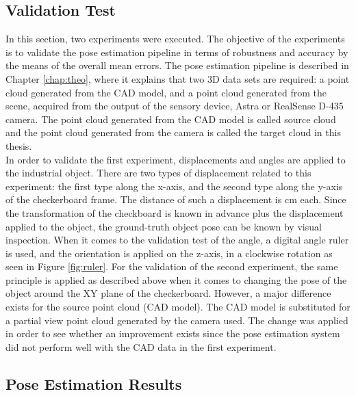 \subsection{Validation Test}\label{valitest}

In this section, two experiments were executed. The objective of the experiments is to validate the pose estimation pipeline in terms of robustness and accuracy by the means of the overall mean errors. The pose estimation pipeline is described in Chapter \ref{chap:theo}, where it explains that two 3D data sets are required: a point cloud generated from the CAD model, and a point cloud generated from the scene, acquired from the output of the sensory device, Astra or RealSense D-435 camera. The point cloud generated from the CAD model is called source cloud and the point cloud generated from the camera is called the target cloud in this thesis.\\
In order to validate the first experiment, displacements and angles are applied to the industrial object. There are two types of displacement related to this experiment: the first type along the x-axis, and the second type along the y-axis of the checkerboard frame. The distance of such a displacement is \unit[2]{cm} each. Since the transformation of the checkboard is known in advance plus the displacement applied to the object, the ground-truth object pose can be known by visual inspection. When it comes to the validation test of the angle, a digital angle ruler is used, and the orientation is applied on the z-axis, in a clockwise rotation as seen in Figure \ref{fig:ruler}. For the validation of the second experiment, the same principle is applied as described above when it comes to changing the pose of the object around the XY plane of the checkerboard. However, a major difference exists for the source point cloud (CAD model). The CAD model is substituted for a partial view point cloud generated by the camera used. The change was applied in order to see whether an improvement exists since the pose estimation system did not perform well with the CAD data in the first experiment. 

\subsection{Pose Estimation Results}\label{cesar}
 
